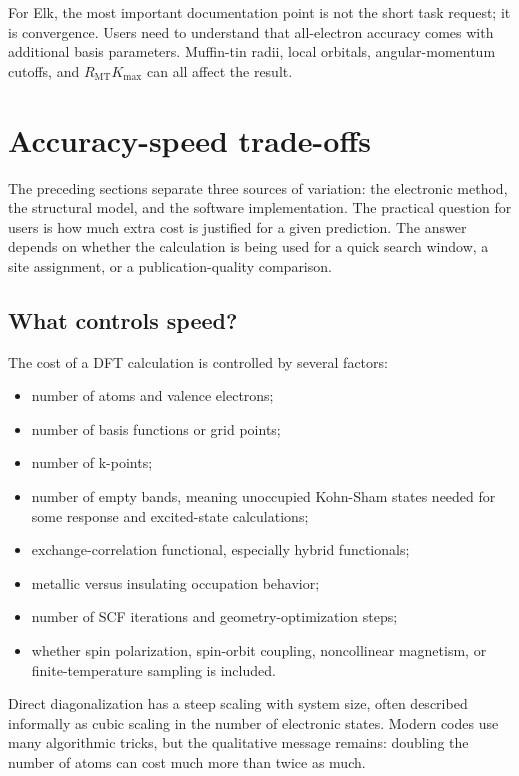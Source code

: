 \documentclass[11pt]{article}
\newcommand{\RMT}{R_{\mathrm{MT}}}
\begin{document}
For Elk, the most important documentation point is not the short task request; it is convergence.  Users need to understand that all-electron accuracy comes with additional basis parameters.  Muffin-tin radii, local orbitals, angular-momentum cutoffs, and $\RMT K_{\max}$ can all affect the result.

\section{Accuracy-speed trade-offs}

The preceding sections separate three sources of variation: the electronic method, the structural model, and the software implementation.  The practical question for users is how much extra cost is justified for a given prediction.  The answer depends on whether the calculation is being used for a quick search window, a site assignment, or a publication-quality comparison.

\subsection{What controls speed?}

The cost of a DFT calculation is controlled by several factors:
\begin{itemize}
\item number of atoms and valence electrons;
\item number of basis functions or grid points;
\item number of k-points;
\item number of empty bands, meaning unoccupied Kohn-Sham states needed for some response and excited-state calculations;
\item exchange-correlation functional, especially hybrid functionals;
\item metallic versus insulating occupation behavior;
\item number of SCF iterations and geometry-optimization steps;
\item whether spin polarization, spin-orbit coupling, noncollinear magnetism, or finite-temperature sampling is included.
\end{itemize}
Direct diagonalization has a steep scaling with system size, often described informally as cubic scaling in the number of electronic states.  Modern codes use many algorithmic tricks, but the qualitative message remains: doubling the number of atoms can cost much more than twice as much.
\end{document}
